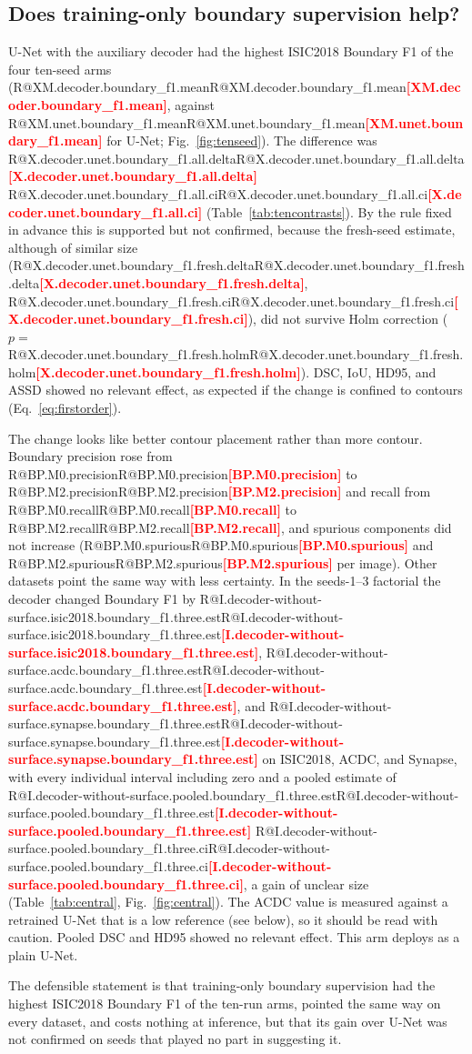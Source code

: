 \documentclass[fleqn,10pt,lineno]{wlpeerj}
\makeatletter
\newcommand{\R}[1]{\ifcsname R@#1\endcsname\csname R@#1\endcsname\else\textbf{\textcolor{red}{[#1]}}\fi}
\makeatother
\begin{document}
\subsection*{Does training-only boundary supervision help?}
U-Net with the auxiliary decoder had the highest ISIC2018 Boundary F1 of the four ten-seed arms (\R{XM.decoder.boundary_f1.mean}, against \R{XM.unet.boundary_f1.mean} for U-Net; Fig.~\ref{fig:tenseed}). The difference was \R{X.decoder.unet.boundary_f1.all.delta} \R{X.decoder.unet.boundary_f1.all.ci} (Table~\ref{tab:tencontrasts}). By the rule fixed in advance this is supported but not confirmed, because the fresh-seed estimate, although of similar size (\R{X.decoder.unet.boundary_f1.fresh.delta}, \R{X.decoder.unet.boundary_f1.fresh.ci}), did not survive Holm correction ($p=$\,\R{X.decoder.unet.boundary_f1.fresh.holm}). DSC, IoU, HD95, and ASSD showed no relevant effect, as expected if the change is confined to contours (Eq.~\ref{eq:firstorder}).

The change looks like better contour placement rather than more contour. Boundary precision rose from \R{BP.M0.precision} to \R{BP.M2.precision} and recall from \R{BP.M0.recall} to \R{BP.M2.recall}, and spurious components did not increase (\R{BP.M0.spurious} and \R{BP.M2.spurious} per image). Other datasets point the same way with less certainty. In the seeds-1--3 factorial the decoder changed Boundary F1 by \R{I.decoder-without-surface.isic2018.boundary_f1.three.est}, \R{I.decoder-without-surface.acdc.boundary_f1.three.est}, and \R{I.decoder-without-surface.synapse.boundary_f1.three.est} on ISIC2018, ACDC, and Synapse, with every individual interval including zero and a pooled estimate of \R{I.decoder-without-surface.pooled.boundary_f1.three.est} \R{I.decoder-without-surface.pooled.boundary_f1.three.ci}, a gain of unclear size (Table~\ref{tab:central}, Fig.~\ref{fig:central}). The ACDC value is measured against a retrained U-Net that is a low reference (see below), so it should be read with caution. Pooled DSC and HD95 showed no relevant effect. This arm deploys as a plain U-Net.

The defensible statement is that training-only boundary supervision had the highest ISIC2018 Boundary F1 of the ten-run arms, pointed the same way on every dataset, and costs nothing at inference, but that its gain over U-Net was not confirmed on seeds that played no part in suggesting it.
\end{document}

